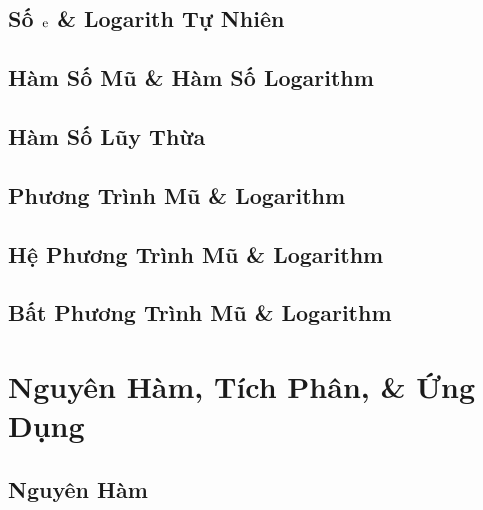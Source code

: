 \documentclass[oneside]{book}
\numberwithin{equation}{section}
\begin{document}
\section{Số $\rm e$ \& Logarith Tự Nhiên}


\section{Hàm Số Mũ \& Hàm Số Logarithm}


\section{Hàm Số Lũy Thừa}


\section{Phương Trình Mũ \& Logarithm}


\section{Hệ Phương Trình Mũ \& Logarithm}


\section{Bất Phương Trình Mũ \& Logarithm}


\chapter{Nguyên Hàm, Tích Phân, \& Ứng Dụng}

\section{Nguyên Hàm}
\end{document}

